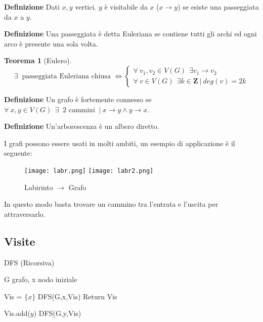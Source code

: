\documentclass{article}
\newtheorem{theorem}{Teorema}
\begin{document}
\noindent\textbf{Definizione} Dati $x,y$ vertici. $y$ è visitabile da $x$ ($x\rightarrow y$) se esiste una passeggiata da $x$ a $y$.\newline

\noindent\textbf{Definizione} Una passeggiata è detta Euleriana se contiene tutti gli archi ed ogni arco è presente una sola volta.\newline

\begin{theorem}[Eulero] $\ $\newline
    \[\exists\ \text{ passeggiata Euleriana chiusa }\iff\begin{cases}
        \forall\ v_1,v_2\in V(G)\ \ \exists v_1\rightarrow v_2\\
        \forall\ v\in V(G)\ \ \exists k\in\mathbf{Z}\ |\ deg(v)=2k
    \end{cases}\]\newline
\end{theorem}

\noindent\textbf{Definizione} Un grafo è fortemente connesso se $\forall\ x,y\in V(G)\ \ \exists\ \text{ 2 cammini }\ |\ x\rightarrow y \wedge y\rightarrow x$.\newline

\noindent\textbf{Definizione} Un'arborescenza è un albero diretto.\newline

\noindent I grafi possono essere usati in molti ambiti, un esempio di applicazione è il seguente:

\begin{figure}[ht]
    \centering
    \texttt{[image: labr.png]}
    \texttt{[image: labr2.png]}
    \caption{Labirinto $\rightarrow$ Grafo}
    \label{fig:labr}
\end{figure}

\noindent In questo modo basta trovare un cammino tra l'entrata e l'uscita per attraversarlo.

\newpage

\subsection{Visite}

\begin{algorithm}[ht]
\caption{DFS (Ricorsiva)}
\begin{algorithmic}

\State G grafo, x nodo iniziale
\State

\State Vis = $\{x\}$
\State DFS(G,x,Vis)
\State Return Vis

\State



            \State Vis.add($y$)
            \State DFS(G,y,Vis)

        \EndIf
    \EndFor

\EndFunction

\end{algorithmic}
\end{algorithm}
\end{document}
